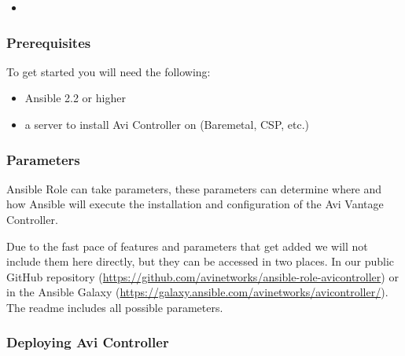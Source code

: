 \documentclass[letterpaper,10pt,english]{sphinxmanual}
\begin{document}
\begin{sphinxShadowBox}
\begin{itemize}
\begin{itemize}
\begin{itemize}
\item {} 
\label{\detokenize{integrations/ansible/controller:id13}}{\hyperref[\detokenize{integrations/ansible/controller:using-qcow-image}]{}}

\end{itemize}

\end{itemize}

\end{itemize}
\end{sphinxShadowBox}


\subsubsection{Prerequisites}
\label{\detokenize{integrations/ansible/controller:prerequisites}}
To get started you will need the following:
\begin{itemize}
\item {} 
Ansible 2.2 or higher

\item {} 
a server to install Avi Controller on (Baremetal, CSP, etc.)

\end{itemize}


\subsubsection{Parameters}
\label{\detokenize{integrations/ansible/controller:parameters}}
Ansible Role can take parameters, these parameters can determine where and how Ansible will execute the installation and configuration of the Avi Vantage Controller.

Due to the fast pace of features and parameters that get added we will not include them here directly, but they can be accessed in two places. In our public GitHub repository (\url{https://github.com/avinetworks/ansible-role-avicontroller}) or in the Ansible Galaxy (\url{https://galaxy.ansible.com/avinetworks/avicontroller/}). The readme includes all possible parameters.


\subsubsection{Deploying Avi Controller}
\label{\detokenize{integrations/ansible/controller:deploying-avi-controller}}
\end{document}
